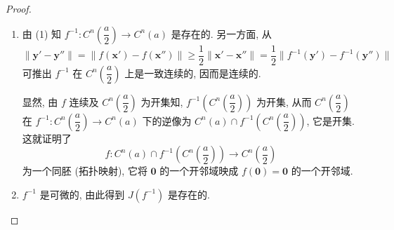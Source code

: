 \begin{proof}
\begin{enumerate}
再证惟一性. 如果 $\exists\,\boldsymbol{x}, \boldsymbol{x}' \in C^{n}(a)$, s. t.\ $f(\boldsymbol{x}) = \boldsymbol{y} = f(\boldsymbol{x}')$, 则由
\[
  0 = \|f(\boldsymbol{x}) - f(\boldsymbol{x}')\| \geqslant \frac{1}{2}\|\boldsymbol{x} - \boldsymbol{x}'\| \geqslant 0,
\]
推得 $\|\boldsymbol{x} - \boldsymbol{x}'\| = 0$, $\boldsymbol{x} = \boldsymbol{x}'$.

\item[(2)] 由 (1) 知 $f^{-1}: C^{n}\left(\dfrac{a}{2}\right) \to C^{n}(a)$ 是存在的. 另一方面, 从
\[
  \|\boldsymbol{y}' - \boldsymbol{y}''\| = \|f(\boldsymbol{x}') - f(\boldsymbol{x}'')\| \geqslant \frac{1}{2}\|\boldsymbol{x}' - \boldsymbol{x}''\| = \frac{1}{2}\|f^{-1}(\boldsymbol{y}') - f^{-1}(\boldsymbol{y}'')\|
\]
可推出 $f^{-1}$ 在 $C^{n}\left(\dfrac{a}{2}\right)$ 上是一致连续的, 因而是连续的.

显然, 由 $f$ 连续及 $C^{n}\left(\dfrac{a}{2}\right)$ 为开集知, $f^{-1}\left(C^{n}\left(\dfrac{a}{2}\right)\right)$ 为开集, 从而 $C^{n}\left(\dfrac{a}{2}\right)$ 在 $f^{-1}: C^{n}\left(\dfrac{a}{2}\right) \to C^{n}(a)$ 下的逆像为 $C^{n}(a) \cap f^{-1}\left(C^{n}\left(\dfrac{a}{2}\right)\right)$, 它是开集. 这就证明了
\[
  f: C^{n}(a) \cap f^{-1}\left(C^{n}\left(\frac{a}{2}\right)\right) \to C^{n}\left(\frac{a}{2}\right)
\]
为一个同胚 (拓扑映射), 它将 $\boldsymbol{0}$ 的一个开邻域映成 $f(\boldsymbol{0}) = \boldsymbol{0}$ 的一个开邻域.

\item[(3)] $f^{-1}$ 是可微的, 由此得到 $J(f^{-1})$ 是存在的.


\end{enumerate}
\end{proof}
